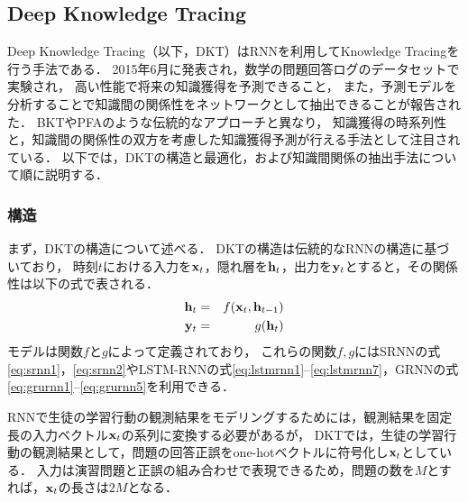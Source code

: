\subsection{Deep Knowledge Tracing}
Deep Knowledge Tracing\cite{piech2015deep}（以下，DKT）はRNNを利用してKnowledge Tracingを行う手法である．
2015年6月に発表され，数学の問題回答ログのデータセットで実験され，
高い性能で将来の知識獲得を予測できること，
また，予測モデルを分析することで知識間の関係性をネットワークとして抽出できることが報告された．
BKTやPFAのような伝統的なアプローチと異なり，
知識獲得の時系列性と，知識間の関係性の双方を考慮した知識獲得予測が行える手法として注目されている．
以下では，DKTの構造と最適化，および知識間関係の抽出手法について順に説明する．



\subsubsection{構造}
まず，DKTの構造について述べる．
DKTの構造は伝統的なRNNの構造に基づいており，
時刻$t$における入力を${\bf x}_t$，隠れ層を${\bf h}_t$，出力を${\bf y}_t$とすると，その関係性は以下の式で表される．
\begin{eqnarray}
\label{eq:rnn1}
{\bf h}_t &=& f({\bf x}_t, {\bf h}_{t-1})\\
\label{eq:rnn2}
{\bf y}_t &=& g({\bf h}_t)
\end{eqnarray}
モデルは関数$f$と$g$によって定義されており，
これらの関数$f, g$にはSRNNの式\ref{eq:srnn1}，\ref{eq:srnn2}やLSTM-RNNの式\ref{eq:lstmrnn1}--\ref{eq:lstmrnn7}，GRNNの式\ref{eq:grurnn1}--\ref{eq:grurnn5}を利用できる． 


RNNで生徒の学習行動の観測結果をモデリングするためには，観測結果を固定長の入力ベクトル${\bf x}_t$の系列に変換する必要があるが，
DKTでは，生徒の学習行動の観測結果として，問題の回答正誤をone-hotベクトルに符号化し${\bf x}_t$としている．
入力は演習問題と正誤の組み合わせで表現できるため，問題の数を$M$とすれば，${\bf x}_t$の長さは$2M$となる．


